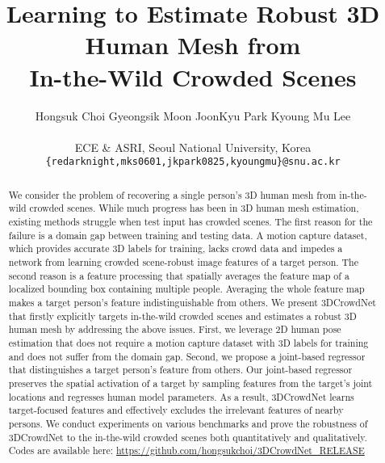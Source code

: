 \documentclass[10pt,twocolumn,letterpaper]{article}
\begin{document}
\title{Learning to Estimate Robust 3D Human Mesh from\\In-the-Wild Crowded Scenes}

\author{
Hongsuk Choi\hspace{1.0cm} Gyeongsik Moon\hspace{1.0cm} JoonKyu Park\hspace{1.0cm} Kyoung Mu Lee\\
\\
ECE \& ASRI, Seoul National University, Korea \hspace{1.0cm}
\\
{\small \texttt {\{redarknight,mks0601,jkpark0825,kyoungmu\}@snu.ac.kr}}
}



\maketitle

\begin{abstract}
We consider the problem of recovering a single person's 3D human mesh from in-the-wild crowded scenes.
While much progress has been in 3D human mesh estimation, existing methods struggle when test input has crowded scenes.
The first reason for the failure is a domain gap between training and testing data.
A motion capture dataset, which provides accurate 3D labels for training, lacks crowd data and impedes a network from learning crowded scene-robust image features of a target person.
The second reason is a feature processing that spatially averages the feature map of a localized bounding box containing multiple people.
Averaging the whole feature map makes a target person's feature indistinguishable from others.
We present 3DCrowdNet that firstly explicitly targets in-the-wild crowded scenes and estimates a robust 3D human mesh by addressing the above issues.
First, we leverage 2D human pose estimation that does not require a motion capture dataset with 3D labels for training and does not suffer from the domain gap.
Second, we propose a joint-based regressor that distinguishes a target person's feature from others.
Our joint-based regressor preserves the spatial activation of a target by sampling features from the target's joint locations and regresses human model parameters.
As a result, 3DCrowdNet learns target-focused features and effectively excludes the irrelevant features of nearby persons.
We conduct experiments on various benchmarks and prove the robustness of 3DCrowdNet to the in-the-wild crowded scenes both quantitatively and qualitatively.
Codes are available here: \url{https://github.com/hongsukchoi/3DCrowdNet_RELEASE}
\end{abstract}
\end{document}
